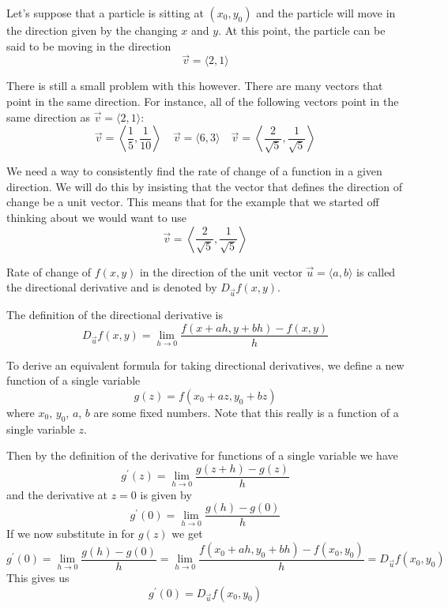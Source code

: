 Let's suppose that a particle is sitting at $(x_0,y_0)$ and the particle will move in the direction given by the changing 
$x$ and $y$. At this point, the particle can be said to be moving in the direction
\[ \vec{v} = \langle {2,1} \rangle \]

There is still a small problem with this however. There are many vectors that point in the same direction. For instance, all of the following vectors point in the same direction as $\vec v = \langle {2,1} \rangle$:
\[ \vec{v} = \left\langle {\frac{1}{5},\frac{1}{10}}\right\rangle \quad \vec{v} = \langle {6,3}\rangle \quad \vec{v} = \left\langle {\frac{2}{\sqrt{5}},\frac{1}{\sqrt{5}}}\right\rangle \]

We need a way to consistently find the rate of change of a function in a given direction. We will do this by insisting that the vector that defines the direction of change be a unit vector. This means that for the example that we started off thinking about we would want to use
\[ \vec{v} = \left\langle {\frac{2}{\sqrt{5}},\frac{1}{\sqrt{5}}}\right\rangle \]

\begin{definition}
Rate of change of $f(x,y)$ in the direction of the unit vector $\vec{u}=\langle{a,b}\rangle$ is called the directional derivative and is denoted by $D_{\vec{u}} f(x,y)$.

The definition of the directional derivative is
\begin{equation}
{D_{\vec u}}f(x,y) = \lim_{h\to0} \frac{f(x + ah,y + bh) - f(x,y)}{h}
\end{equation}
\end{definition}

To derive an equivalent formula for taking directional derivatives, we define a new function of a single variable
\[ g(z) = f(x_0+az,y_0+bz) \]
where $x_0$, $y_0$, $a$, $b$ are some fixed numbers. Note that this really is a function of a single variable $z$.

Then by the definition of the derivative for functions of a single variable we have
\[ g^\prime(z) = \lim_{h\to0} \frac{g(z+h)-g(z)}{h} \]
and the derivative at $z=0$ is given by
\[ g^\prime(0) = \lim_{h\to0} \frac{g(h)-g(0)}{h} \]
If we now substitute in for $g(z)$ we get
\[ g^\prime(0) = \lim_{h\to0} \frac{g(h)-g(0)}{h} = \lim_{h\to0} \frac{f(x_0+ah,y_0+bh) - f(x_0,y_0)}{h} = D_{\vec u}f(x_0,y_0) \]
This gives us
\begin{equation}\tag{1}
g^\prime(0) = D_{\vec u}f(x_0,y_0)
\end{equation}

